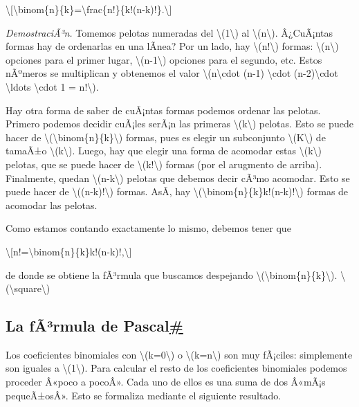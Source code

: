 \documentclass[
]{article}
\begin{document}
\textbackslash{[}\textbackslash binom\{n\}\{k\}=\textbackslash frac\{n!\}\{k!(n-k)!\}.\textbackslash{]}

\emph{DemostraciÃ³n.} Tomemos pelotas numeradas del
{\textbackslash(1\textbackslash)} al {\textbackslash(n\textbackslash)}.
Â¿CuÃ¡ntas formas hay de ordenarlas en una lÃ­nea? Por un lado, hay
{\textbackslash(n!\textbackslash)} formas:
{\textbackslash(n\textbackslash)} opciones para el primer lugar,
{\textbackslash(n-1\textbackslash)} opciones para el segundo, etc. Estos
nÃºmeros se multiplican y obtenemos el valor
{\textbackslash(n\textbackslash cdot (n-1) \textbackslash cdot
(n-2)\textbackslash cdot \textbackslash ldots \textbackslash cdot 1 =
n!\textbackslash)}.

Hay otra forma de saber de cuÃ¡ntas formas podemos ordenar las pelotas.
Primero podemos decidir cuÃ¡les serÃ¡n las primeras
{\textbackslash(k\textbackslash)} pelotas. Esto se puede hacer de
{\textbackslash(\textbackslash binom\{n\}\{k\}\textbackslash)} formas,
pues es elegir un subconjunto {\textbackslash(K\textbackslash)} de
tamaÃ±o {\textbackslash(k\textbackslash)}. Luego, hay que elegir una
forma de acomodar estas {\textbackslash(k\textbackslash)} pelotas, que
se puede hacer de {\textbackslash(k!\textbackslash)} formas (por el
arugmento de arriba). Finalmente, quedan
{\textbackslash(n-k\textbackslash)} pelotas que debemos decir cÃ³mo
acomodar. Esto se puede hacer de {\textbackslash((n-k)!\textbackslash)}
formas. AsÃ­, hay
{\textbackslash(\textbackslash binom\{n\}\{k\}k!(n-k)!\textbackslash)}
formas de acomodar las pelotas.

Como estamos contando exactamente lo mismo, debemos tener que

\textbackslash{[}n!=\textbackslash binom\{n\}\{k\}k!(n-k)!,\textbackslash{]}

de donde se obtiene la fÃ³rmula que buscamos despejando
{\textbackslash(\textbackslash binom\{n\}\{k\}\textbackslash)}.
{{\textbackslash(\textbackslash square\textbackslash)}}

\label{la-formula-de-pascal}
\subsection{\texorpdfstring{La fÃ³rmula de
Pascal\hyperref[la-formula-de-pascal]{\#}}{La fÃ³rmula de Pascal\#}}\label{la-fuxe3uxb3rmula-de-pascal}

Los coeficientes binomiales con {\textbackslash(k=0\textbackslash)} o
{\textbackslash(k=n\textbackslash)} son muy fÃ¡ciles: simplemente son
iguales a {\textbackslash(1\textbackslash)}. Para calcular el resto de
los coeficientes binomiales podemos proceder Â«poco a pocoÂ». Cada uno
de ellos es una suma de dos Â«mÃ¡s pequeÃ±osÂ». Esto se formaliza
mediante el siguiente resultado.
\end{document}
